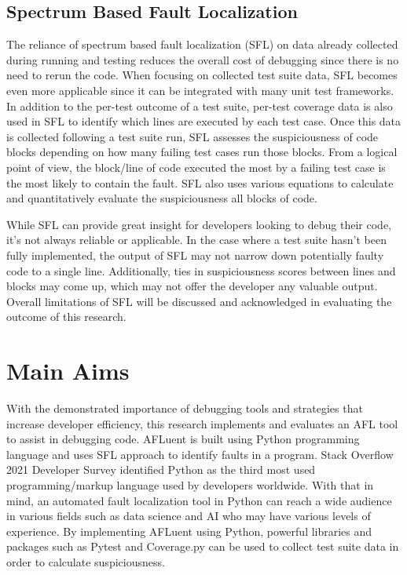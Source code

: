 \subsection{Spectrum Based Fault Localization}
\label{subsec:SpectrumBased}

The reliance of spectrum based fault localization (SFL) on data already
collected during running and testing reduces the overall cost of debugging since
there is no need to rerun the code. When focusing on collected test suite data,
SFL becomes even more applicable since it can be integrated with many unit test
frameworks. In addition to the per-test outcome of a test suite, per-test
coverage data is also used in SFL to identify which lines are executed by each
test case. Once this data is collected following a test suite run, SFL assesses
the suspiciousness of code blocks depending on how many failing test cases run
those blocks. From a logical point of view, the block/line of code executed the
most by a failing test case is the most likely to contain the fault. SFL also
uses various equations to calculate and quantitatively evaluate the
suspiciousness all blocks of code.

While SFL can provide great insight for developers looking to debug their code,
it's not always reliable or applicable. In the case where a test suite hasn't
been fully implemented, the output of SFL may not narrow down potentially faulty
code to a single line. Additionally, ties in suspiciousness scores between lines
and blocks may come up, which may not offer the developer any valuable output.
Overall limitations of SFL will be discussed and acknowledged
in evaluating the outcome of this research.


\section{Main Aims}
\label{sec:aims}

With the demonstrated importance of debugging tools and strategies that increase
developer efficiency, this research implements and evaluates an AFL tool to
assist in debugging code. AFLuent is built using  Python programming
language and uses SFL approach to identify faults in a
program. Stack Overflow 2021 Developer Survey identified Python as the third
most used programming/markup language used by developers worldwide. With that in
mind, an automated fault localization tool in Python can reach a wide audience
in various fields such as data science and AI who may have various levels of
experience. By implementing AFLuent using Python, powerful libraries and
packages such as Pytest and Coverage.py can be used to collect test suite data
in order to calculate suspiciousness.

